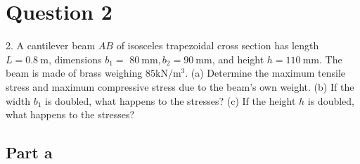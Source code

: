 \documentclass[12pt]{article}
\begin{document}
\section*{Question 2}
\begin{q}
2. A cantilever beam \(A B\) of isosceles trapezoidal cross section has length \(L=0.8 \mathrm{~m}\), dimensions \(b_1=\) \(80 \mathrm{~mm}, b_2=90 \mathrm{~mm}\), and height \(h=110 \mathrm{~mm}\). The beam is made of brass weighing \(85 \mathrm{kN} / \mathrm{m}^3\).
(a) Determine the maximum tensile stress and maximum compressive stress due to the beam's own weight.
(b) If the width \(b_1\) is doubled, what happens to the stresses?
(c) If the height \(h\) is doubled, what happens to the stresses?
\end{q}
\begin{figure}[!ht]
    \centering
    \caption{}
    \label{fig:enter-label}
\end{figure}


\subsection*{Part a}
\end{document}
